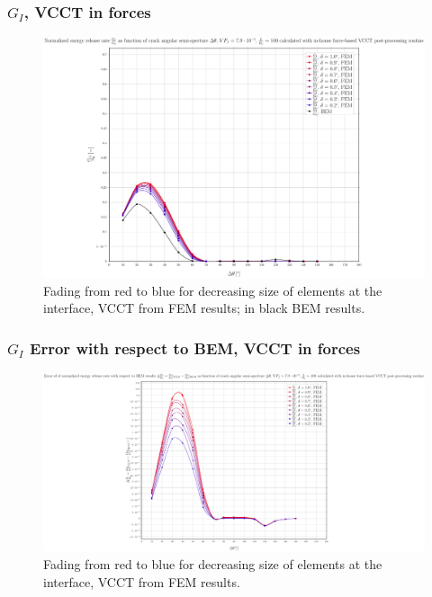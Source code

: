 \documentclass[first,firstsupp,lastsupp,handout,last,hyperref,table]{ETHclass}
\begin{document}
\begin{frame}
\frametitle{\small $G_{I}$, VCCT in forces}
\vspace{-0.5cm}
\centering
\captionsetup[figure]{font=scriptsize,labelfont=scriptsize}
\begin{figure}[!h]
\centering
\includegraphics[height=0.7\textheight]{2017-07-10_AbqRunSummary_SmallStrain_M-F-VCCT_GI.pdf}
  \caption{\scriptsize Fading from red to blue for decreasing size of elements at the interface, VCCT from FEM results; in black BEM results.}
  \label{fig:res1}
\end{figure}
\end{frame}

\begin{frame}
\frametitle{\small $G_{I}$ Error with respect to BEM, VCCT in forces}
\vspace{-0.5cm}
\centering
\captionsetup[figure]{font=scriptsize,labelfont=scriptsize}
\begin{figure}[!h]
\centering
\includegraphics[height=0.7\textheight]{2017-07-10_AbqRunSummary_SmallStrain_M-F-VCCT_GI_ERR.pdf}
  \caption{\scriptsize Fading from red to blue for decreasing size of elements at the interface, VCCT from FEM results.}
  \label{fig:res1}
\end{figure}
\end{frame}
\end{document}
